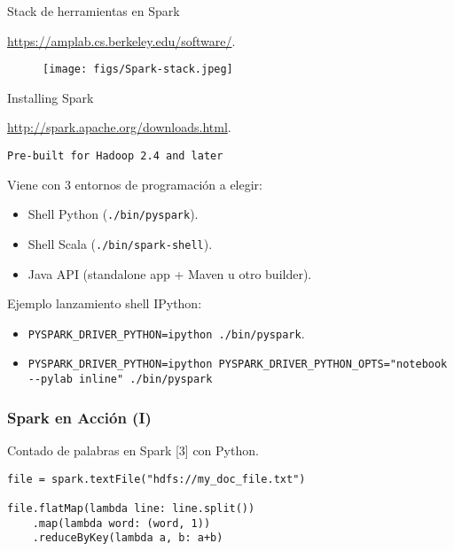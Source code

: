 
\begin{frame}{Stack de herramientas en Spark}
\begin{wideitemize}
 \item \url{https://amplab.cs.berkeley.edu/software/}.
\end{wideitemize}


\begin{figure}
 \centering
 \texttt{[image: figs/Spark-stack.jpeg]}
\end{figure}

\end{frame}


\begin{frame}{Installing Spark}
    \begin{wideitemize}
    \item \url{http://spark.apache.org/downloads.html}.
    \item \texttt{Pre-built for Hadoop 2.4 and later}
    \item Viene con 3 entornos de programación a elegir:
    \begin{itemize}
      \item Shell Python (\texttt{./bin/pyspark}).
      \item Shell Scala (\texttt{./bin/spark-shell}).
      \item Java API (standalone app + Maven u otro builder).
    \end{itemize}

  \item Ejemplo lanzamiento shell IPython:
  \begin{itemize}
    \item \texttt{PYSPARK\_DRIVER\_PYTHON=ipython ./bin/pyspark}.
    \item \texttt{PYSPARK\_DRIVER\_PYTHON=ipython 
    PYSPARK\_DRIVER\_PYTHON\_OPTS="notebook
    -\--pylab inline" ./bin/pyspark}
  \end{itemize}

  \end{wideitemize}

\end{frame}


\begin{frame}[fragile]
  \frametitle{Spark en Acción (I)}
    \begin{wideitemize}
      \item Contado de palabras en Spark [3] con Python.
    \end{wideitemize}
  \fontsize{8pt}{12pt}\selectfont
  \begin{verbatim}
file = spark.textFile("hdfs://my_doc_file.txt")
 
file.flatMap(lambda line: line.split())
    .map(lambda word: (word, 1))
    .reduceByKey(lambda a, b: a+b) 
  \end{verbatim}

\end{frame}

